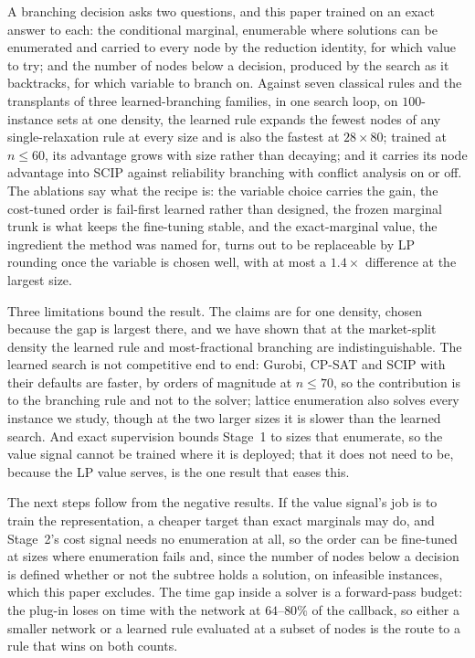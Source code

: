 \documentclass[final,5p,times,twocolumn,authoryear]{elsarticle}
\begin{document}
A branching decision asks two questions, and this paper trained on an exact answer to each: the conditional marginal, enumerable where solutions can be enumerated and carried to every node by the reduction identity, for which value to try; and the number of nodes below a decision, produced by the search as it backtracks, for which variable to branch on. Against seven classical rules and the transplants of three learned-branching families, in one search loop, on $100$-instance sets at one density, the learned rule expands the fewest nodes of any single-relaxation rule at every size and is also the fastest at $28\times80$; trained at $n\le60$, its advantage grows with size rather than decaying; and it carries its node advantage into SCIP against reliability branching with conflict analysis on or off. The ablations say what the recipe is: the variable choice carries the gain, the cost-tuned order is fail-first learned rather than designed, the frozen marginal trunk is what keeps the fine-tuning stable, and the exact-marginal value, the ingredient the method was named for, turns out to be replaceable by LP rounding once the variable is chosen well, with at most a $1.4\times$ difference at the largest size.

Three limitations bound the result. The claims are for one density, chosen because the gap is largest there, and we have shown that at the market-split density the learned rule and most-fractional branching are indistinguishable. The learned search is not competitive end to end: Gurobi, CP-SAT and SCIP with their defaults are faster, by orders of magnitude at $n\le70$, so the contribution is to the branching rule and not to the solver; lattice enumeration also solves every instance we study, though at the two larger sizes it is slower than the learned search. And exact supervision bounds Stage~1 to sizes that enumerate, so the value signal cannot be trained where it is deployed; that it does not need to be, because the LP value serves, is the one result that eases this.

The next steps follow from the negative results. If the value signal's job is to train the representation, a cheaper target than exact marginals may do, and Stage~2's cost signal needs no enumeration at all, so the order can be fine-tuned at sizes where enumeration fails and, since the number of nodes below a decision is defined whether or not the subtree holds a solution, on infeasible instances, which this paper excludes. The time gap inside a solver is a forward-pass budget: the plug-in loses on time with the network at $64$--$80\%$ of the callback, so either a smaller network or a learned rule evaluated at a subset of nodes is the route to a rule that wins on both counts.
\end{document}
